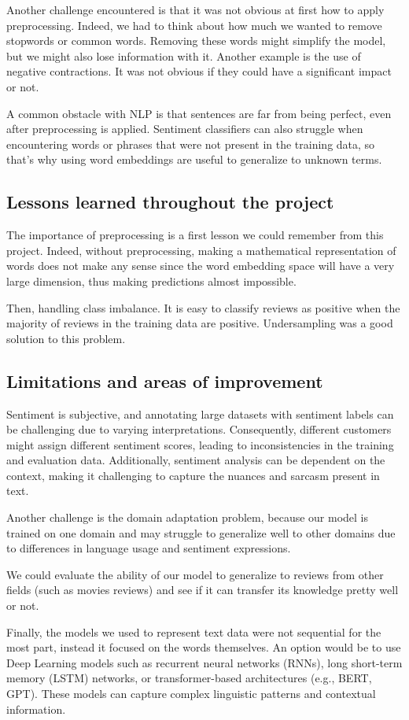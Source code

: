 \documentclass{article}
\begin{document}
Another challenge encountered is that it was not obvious at first how to apply preprocessing. Indeed, we had to think about how much we wanted to remove stopwords or common words. Removing these words might simplify the model, but we might also lose information with it. Another example is the use of negative contractions. It was not obvious if they could have a significant impact or not.

A common obstacle with NLP is that sentences are far from being perfect, even after preprocessing is applied. Sentiment classifiers can also struggle when encountering words or phrases that were not present in the training data, so that's why using word embeddings are useful to generalize to unknown terms. 

\subsection{Lessons learned throughout the project}

The importance of preprocessing is a first lesson we could remember from this project. Indeed, without preprocessing, making a mathematical representation of words does not make any sense since the word embedding space will have a very large dimension, thus making predictions almost impossible.

Then, handling class imbalance. It is easy to classify reviews as positive when the majority of reviews in the training data are positive. Undersampling was a good solution to this problem. 

\subsection{Limitations and areas of improvement}

Sentiment is subjective, and annotating large datasets with sentiment labels can be challenging due to varying interpretations. Consequently, different customers might assign different sentiment scores, leading to inconsistencies in the training and evaluation data. Additionally, sentiment analysis can be dependent on the context, making it challenging to capture the nuances and sarcasm present in text. 

Another challenge is the domain adaptation problem, because our model is trained on one domain and may struggle to generalize well to other domains due to differences in language usage and sentiment expressions.

We could evaluate the ability of our model to generalize to reviews from other fields (such as movies reviews) and see if it can transfer its knowledge pretty well or not.

Finally, the models we used to represent text data were not sequential for the most part, instead it focused on the words themselves. An option would be to use Deep Learning models such as recurrent neural networks (RNNs), long short-term memory (LSTM) networks, or transformer-based architectures (e.g., BERT, GPT). These models can capture complex linguistic patterns and contextual information. 



\printbibliography
\end{document}

